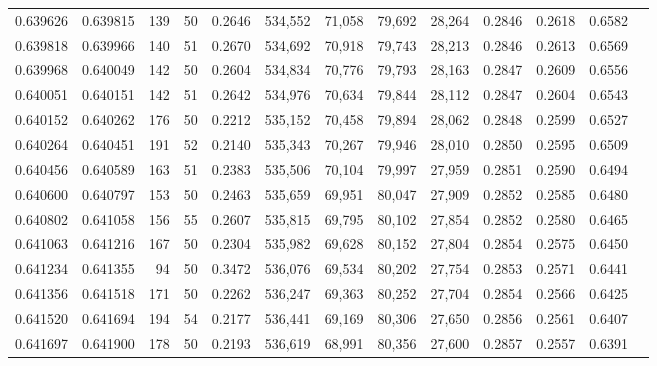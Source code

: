 \begin{tabular}{rrrrrrrrrrrrr}
0.639626 & 0.639815 &   139 &  50 &                                     0.2646 & 534,552 &  71,058 &  79,692 &  28,264 & 0.2846 & 0.2618 & 0.6582 \\
0.639818 & 0.639966 &   140 &  51 &                                     0.2670 & 534,692 &  70,918 &  79,743 &  28,213 & 0.2846 & 0.2613 & 0.6569 \\
0.639968 & 0.640049 &   142 &  50 &                                     0.2604 & 534,834 &  70,776 &  79,793 &  28,163 & 0.2847 & 0.2609 & 0.6556 \\
0.640051 & 0.640151 &   142 &  51 &                                     0.2642 & 534,976 &  70,634 &  79,844 &  28,112 & 0.2847 & 0.2604 & 0.6543 \\
0.640152 & 0.640262 &   176 &  50 &                                     0.2212 & 535,152 &  70,458 &  79,894 &  28,062 & 0.2848 & 0.2599 & 0.6527 \\
0.640264 & 0.640451 &   191 &  52 &                                     0.2140 & 535,343 &  70,267 &  79,946 &  28,010 & 0.2850 & 0.2595 & 0.6509 \\
0.640456 & 0.640589 &   163 &  51 &                                     0.2383 & 535,506 &  70,104 &  79,997 &  27,959 & 0.2851 & 0.2590 & 0.6494 \\
0.640600 & 0.640797 &   153 &  50 &                                     0.2463 & 535,659 &  69,951 &  80,047 &  27,909 & 0.2852 & 0.2585 & 0.6480 \\
0.640802 & 0.641058 &   156 &  55 &                                     0.2607 & 535,815 &  69,795 &  80,102 &  27,854 & 0.2852 & 0.2580 & 0.6465 \\
0.641063 & 0.641216 &   167 &  50 &                                     0.2304 & 535,982 &  69,628 &  80,152 &  27,804 & 0.2854 & 0.2575 & 0.6450 \\
0.641234 & 0.641355 &    94 &  50 &                                     0.3472 & 536,076 &  69,534 &  80,202 &  27,754 & 0.2853 & 0.2571 & 0.6441 \\
0.641356 & 0.641518 &   171 &  50 &                                     0.2262 & 536,247 &  69,363 &  80,252 &  27,704 & 0.2854 & 0.2566 & 0.6425 \\
0.641520 & 0.641694 &   194 &  54 &                                     0.2177 & 536,441 &  69,169 &  80,306 &  27,650 & 0.2856 & 0.2561 & 0.6407 \\
0.641697 & 0.641900 &   178 &  50 &                                     0.2193 & 536,619 &  68,991 &  80,356 &  27,600 & 0.2857 & 0.2557 & 0.6391 \\

\end{tabular}
